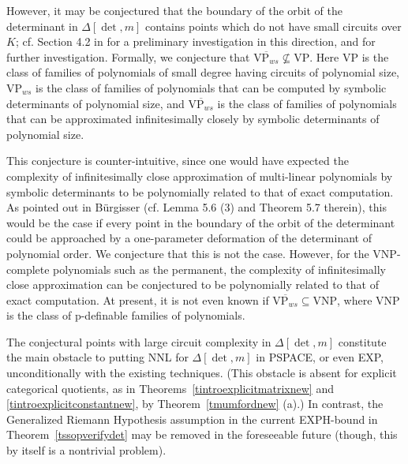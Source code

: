 \documentclass[11pt]{article}
\begin{document}
However, it may be  conjectured that 
the boundary of the orbit of the determinant 
in $\Delta[\det,m]$ contains points which 
do not have small circuits over $K$; 
cf.   Section 4.2  in \cite{GCT1}
for a preliminary investigation in this direction,
and \cite{GCTtutorial,GMQ} for  further investigation.
Formally, we conjecture 
that  $\overline {\mbox{VP}_{ws}} \not \subseteq \mbox{VP}$. Here 
 VP \cite{valiant2}
is the class of families of polynomials of small degree  having  circuits of polynomial
size, $\mbox{VP}_{ws}$ is the class of families of polynomials that can be computed by symbolic determinants
of polynomial size, 
 and  $\overline{\mbox{VP}_{ws}}$ \cite{burg2,manivel} is 
the class of families of polynomials that can be approximated infinitesimally closely
by symbolic determinants of polynomial size. 

This conjecture is  counter-intuitive, since 
one would have expected the complexity of infinitesimally 
close approximation of multi-linear polynomials by symbolic determinants 
to be polynomially related to that of exact computation.
As pointed out in B\"urgisser \cite{burg2} (cf. Lemma 5.6 (3) and Theorem 5.7 therein), 
this would be the case if every point in the boundary of the orbit of the determinant could be 
approached by a one-parameter deformation of the determinant of polynomial order. We conjecture that this is not the case.
However, for the VNP-complete  polynomials  such as the permanent, 
the complexity of infinitesimally 
close approximation can be conjectured to be polynomially related to that of exact computation.
At present, it is not even known  if  $\overline {\mbox{VP}_{ws}}  \subseteq \mbox{VNP}$, where
VNP \cite{valiant2} is the class of p-definable families of polynomials.

The conjectural   points with large circuit complexity  in $\Delta[\det,m]$ 
constitute  the main  obstacle 
to putting  NNL for $\Delta[\det,m]$ in PSPACE, or even EXP,  unconditionally with the existing techniques. 
(This obstacle is absent for explicit categorical quotients, 
as in Theorems~\ref{tintroexplicitmatrixnew} and \ref{tintroexplicitconstantnew},
 by Theorem~\ref{tmumfordnew} (a).)
In contrast,   the  Generalized Riemann Hypothesis assumption
in the current EXPH-bound in Theorem~\ref{tssopverifydet} may  be removed in 
the foreseeable  future (though, this by itself is a nontrivial problem).
\end{document}
